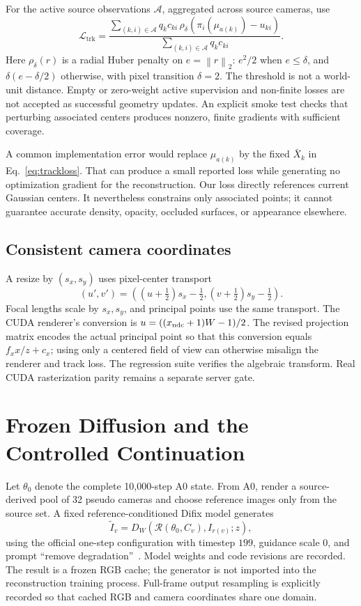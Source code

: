 \documentclass[10pt,twocolumn,letterpaper]{article}
\newcommand{\norm}[1]{\left\lVert#1\right\rVert}
\newcommand{\cL}{\mathcal{L}}
\begin{document}
For the active source observations $\mathcal A$, aggregated across source cameras, use
\begin{equation}
\cL_{\mathrm{trk}}=
\frac{\sum_{(k,i)\in\mathcal A}q_kc_{ki}\,
\rho_\delta(\pi_i(\mu_{a(k)})-u_{ki})}
{\sum_{(k,i)\in\mathcal A}q_kc_{ki}}.
\label{eq:trackloss}
\end{equation}
Here $\rho_\delta(r)$ is a radial Huber penalty on $e=\norm{r}_2$: $e^2/2$ when $e\leq\delta$, and $\delta(e-\delta/2)$ otherwise, with pixel transition $\delta=2$. The threshold is not a world-unit distance. Empty or zero-weight active supervision and non-finite losses are not accepted as successful geometry updates. An explicit smoke test checks that perturbing associated centers produces nonzero, finite gradients with sufficient coverage.

A common implementation error would replace $\mu_{a(k)}$ by the fixed $\bar X_k$ in Eq.~\eqref{eq:trackloss}. That can produce a small reported loss while generating no optimization gradient for the reconstruction. Our loss directly references current Gaussian centers. It nevertheless constrains only associated points; it cannot guarantee accurate density, opacity, occluded surfaces, or appearance elsewhere.

\subsection{Consistent camera coordinates}
A resize by $(s_x,s_y)$ uses pixel-center transport
\begin{equation}
(u',v')=((u+\tfrac12)s_x-\tfrac12,
(v+\tfrac12)s_y-\tfrac12).
\label{eq:pixelresize}
\end{equation}
Focal lengths scale by $s_x,s_y$, and principal points use the same transport. The CUDA renderer's conversion is $u=((x_{\rm ndc}+1)W-1)/2$. The revised projection matrix encodes the actual principal point so that this conversion equals $f_xx/z+c_x$; using only a centered field of view can otherwise misalign the renderer and track loss. The regression suite verifies the algebraic transform. Real CUDA rasterization parity remains a separate server gate.

\section{Frozen Diffusion and the Controlled Continuation}
Let $\theta_0$ denote the complete 10,000-step A0 state. From A0, render a source-derived pool of 32 pseudo cameras and choose reference images only from the source set. A fixed reference-conditioned Difix model generates
\begin{equation}
\widetilde I_v=D_W(\mathcal R(\theta_0,C_v),I_{r(v)};z),
\end{equation}
using the official one-step configuration with timestep $199$, guidance scale $0$, and prompt ``remove degradation''~\citep{wu2025difix}. Model weights and code revisions are recorded. The result is a frozen RGB cache; the generator is not imported into the reconstruction training process. Full-frame output resampling is explicitly recorded so that cached RGB and camera coordinates share one domain.
\end{document}
